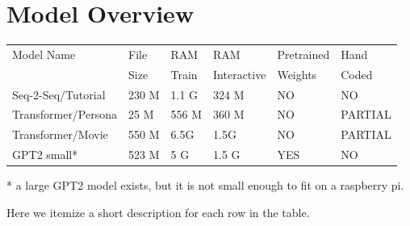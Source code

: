 \section{Model Overview}


\begin{table}[h!]
	
	\begin{center}
		
		
		\begin{tabular}{llllll}
			
			Model Name    & File  & RAM  & RAM  & Pretrained  & Hand  \\
			&  Size & Train   & Interactive   & Weights & Coded   \\
			\hline
			\hline
			Seq-2-Seq/Tutorial & 230 M     & 1.1 G & 324 M & NO                 & NO        \\
			Transformer/Persona   & 25 M      & 556 M & 360 M & NO         & PARTIAL         \\
			Transformer/Movie   & 550 M      & 6.5G & 1.5G & NO         & PARTIAL         \\
			GPT2 small*   & 523 M     & 5 G   & 1.5 G & YES                & NO        \\
			\hline
		\end{tabular}
		
		* a large GPT2 model exists, but it is not small enough to fit on a raspberry pi.
		
		
	\end{center}
	
	\label{fig:modeloverview}
\end{table}

Here we itemize a short description for each row in the table.

